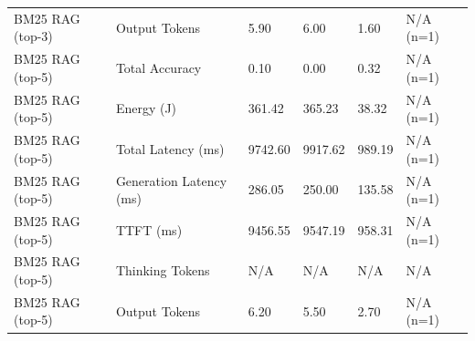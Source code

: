 \begin{table}
\begin{tabular}{llllll}
BM25 RAG (top-3) & Output Tokens & 5.90 & 6.00 & 1.60 & N/A (n=1) \\
BM25 RAG (top-5) & Total Accuracy & 0.10 & 0.00 & 0.32 & N/A (n=1) \\
BM25 RAG (top-5) & Energy (J) & 361.42 & 365.23 & 38.32 & N/A (n=1) \\
BM25 RAG (top-5) & Total Latency (ms) & 9742.60 & 9917.62 & 989.19 & N/A (n=1) \\
BM25 RAG (top-5) & Generation Latency (ms) & 286.05 & 250.00 & 135.58 & N/A (n=1) \\
BM25 RAG (top-5) & TTFT (ms) & 9456.55 & 9547.19 & 958.31 & N/A (n=1) \\
BM25 RAG (top-5) & Thinking Tokens & N/A & N/A & N/A & N/A \\
BM25 RAG (top-5) & Output Tokens & 6.20 & 5.50 & 2.70 & N/A (n=1) \\
\bottomrule
\end{tabular}
\end{table}
